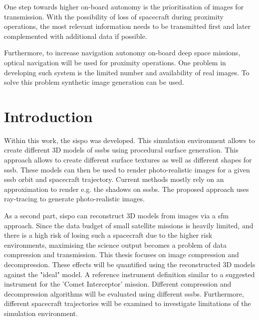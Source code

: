One step towards higher on-board autonomy is the prioritisation of images for transmission. With the  possibility of loss of spacecraft during proximity operations, the most relevant information needs to be transmitted first and later complemented with additional data if possible.

Furthermore, to increase navigation autonomy on-board deep space missions, optical navigation will be used for proximity operations. One problem in developing such system is the limited number and availability of real images. To solve this problem synthetic image generation can be used.

\section{Introduction} \label{sec:introduction}
Within this work, the \gls{sispo} was developed. This simulation environment allows to create different 3D models of \gls{sssb}s using procedural surface generation. This approach allows to create different surface textures as well as different shapes for \gls{sssb}. These models can then be used to render photo-realistic images for a given \gls{sssb} orbit and spacecraft trajectory. Current methods mostly rely on an approximation to render e.g. the shadows on \gls{sssb}s. The proposed approach uses ray-tracing to generate photo-realistic images.

As a second part, \gls{sispo} can reconstruct 3D models from images via a \gls{sfm} approach. Since the data budget of small satellite missions is heavily limited, and there is a high risk of losing such a spacecraft due to the higher risk environments, maximising the science output becomes a problem of data compression and transmission. 
This thesis focuses on image compression and decompression. These effects will be quantified using the reconstructed 3D models against the "ideal" model. A reference instrument definition similar to a suggested instrument for the 'Comet Interceptor' mission. Different compression and decompression algorithms will be evaluated using different \gls{sssb}s. Furthermore, different spacecraft trajectories will be examined to investigate limitations of the simulation environment.